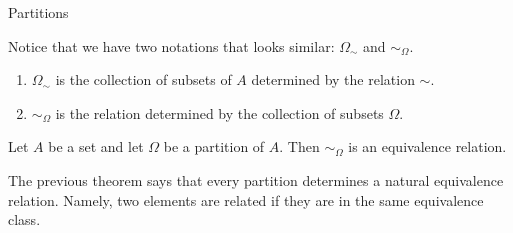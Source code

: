 \begin{section}{Partitions}
\begin{remark}
Notice that we have two notations that looks similar: $\Omega_{\sim}$ and $\sim_{\Omega}$.  
\begin{enumerate}
\item $\Omega_{\sim}$ is the collection of subsets of $A$ determined by the relation $\sim$.
\item $\sim_{\Omega}$ is the relation determined by the collection of subsets $\Omega$.
\end{enumerate}
\end{remark}

\begin{theorem}
Let $A$ be a set and let $\Omega$ be a partition of $A$.  Then $\sim_{\Omega}$ is an equivalence relation.
\end{theorem}

\begin{remark}
The previous theorem says that every partition determines a natural equivalence relation.  Namely, two elements are related if they are in the same equivalence class.
\end{remark}

\end{section}

